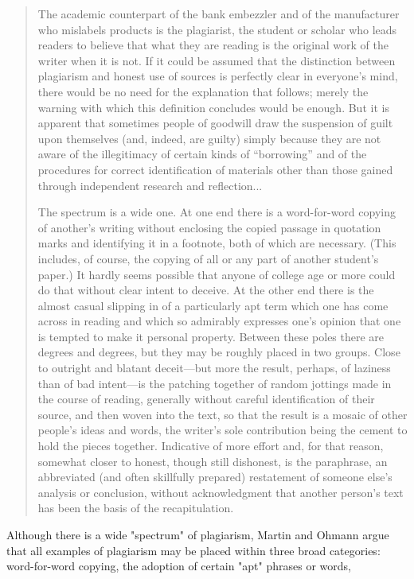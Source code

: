 \begin{quote}The academic counterpart of the bank embezzler and of the manufacturer who mislabels products is the plagiarist, the student or scholar who leads readers to believe that what they are reading is the original work of the writer when it is not. If it could be assumed that the distinction between plagiarism and honest use of sources is perfectly clear in everyone’s mind, there would be no need for the explanation that follows; merely the warning with which this definition concludes would be enough. But it is apparent that sometimes people of goodwill draw the suspension of guilt upon themselves (and, indeed, are guilty) simply because they are not aware of the illegitimacy of certain kinds of “borrowing” and of the procedures for correct identification of materials other than those gained through independent research and reflection...

The spectrum is a wide one. At one end there is a word-for-word copying of another’s writing without enclosing the copied passage in quotation marks and identifying it in a footnote, both of which are necessary. (This includes, of course, the copying of all or any part of another student’s paper.) It hardly seems possible that anyone of college age or more could do that without clear intent to deceive. At the other end there is the almost casual slipping in of a particularly apt term which one has come across in reading and which so admirably expresses one’s opinion that one is tempted to make it personal property. Between these poles there are degrees and degrees, but they may be roughly placed in two groups. Close to outright and blatant deceit—but more the result, perhaps, of laziness than of bad intent—is the patching together of random jottings made in the course of reading, generally without careful identification of their source, and then woven into the text, so that the result is a mosaic of other people’s ideas and words, the writer’s sole contribution being the cement to hold the pieces together. Indicative of more effort and, for that reason, somewhat closer to honest, though still dishonest, is the paraphrase, an abbreviated (and often skillfully prepared) restatement of someone else’s analysis or conclusion, without acknowledgment that another person’s text has been the basis of the recapitulation.\end{quote}

Although there is a wide "spectrum" of plagiarism, Martin and Ohmann argue that all examples  of plagiarism may be placed within three broad categories: word-for-word copying, the adoption of certain "apt" phrases or words, 
